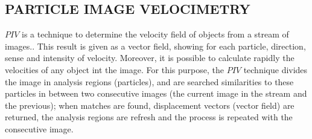 
\subsection{PARTICLE IMAGE VELOCIMETRY}

$PIV$ is a technique to determine the  velocity field of objects from a stream of images.\cite{Bastiaans}.
This result is given as a vector field, showing for each particle, direction, sense and intensity of velocity. 
Moreover, it is possible to calculate rapidly the velocities of any object int the image.
For this purpose, the $PIV$ technique divides the image in analysis regions (particles), 
and are searched similarities to these particles in between two consecutive images 
(the current image in the stream and the previous); 
when matches are found, displacement vectors (vector field) are returned,
the analysis regions are refresh and the process is repeated with the consecutive image.
